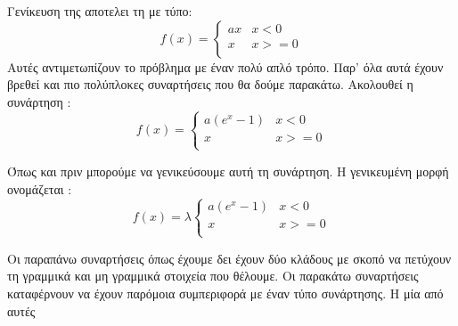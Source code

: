 Γενίκευση της αποτελει τη  με τύπο:
\[f(x)=\left\{\begin{array}{ll}ax & x<0 \\ x & x>=0 \\ \end{array} \right.\]
Αυτές αντιμετωπίζουν το πρόβλημα με έναν πολύ απλό τρόπο. Παρ' όλα αυτά έχουν βρεθεί και πιο πολύπλοκες συναρτήσεις που θα δούμε παρακάτω. Ακολουθεί η συνάρτηση :
\[f(x)=\left\{\begin{array}{ll}a(e^x-1) & x<0 \\ x & x>=0 \\ \end{array} \right.\]
\begin{figure}[H]
    \centering
    \caption{}
\end{figure}
Όπως και πριν μπορούμε να γενικεύσουμε αυτή τη συνάρτηση. Η γενικευμένη μορφή ονομάζεται :
\[f(x)=\lambda\left\{\begin{array}{ll}a(e^x-1) & x<0 \\ x & x>=0 \\ \end{array} \right.\]
\begin{figure}[H]
    \centering
    \caption{}
\end{figure}
Οι παραπάνω συναρτήσεις όπως έχουμε δει έχουν δύο κλάδους με σκοπό να πετύχουν τη γραμμικά και μη γραμμικά στοιχεία που θέλουμε. Οι παρακάτω συναρτήσεις καταφέρνουν να έχουν παρόμοια συμπεριφορά με έναν τύπο συνάρτησης. Η μία από αυτές
